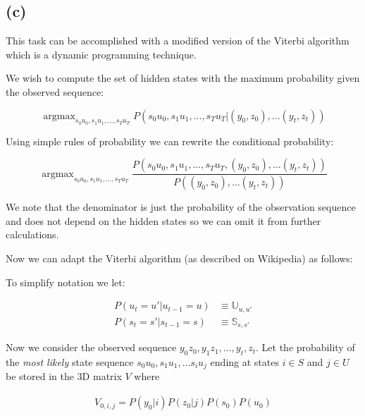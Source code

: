 \documentclass[11pt]{amsart}
\DeclareMathOperator*{\argmax}{argmax}
\begin{document}
\subsection{(c)}

This task can be accomplished with a modified version of the Viterbi algorithm which is a dynamic programming technique.

We wish to compute the set of hidden states with the maximum probability given the observed sequence:

\begin{equation}
\argmax_{s_0 u_0, s_1 u_1, ..., s_T u_T} P(s_0 u_0, s_1 u_1, ..., s_T u_T \vert (y_0, z_0),...(y_t, z_t))
\end{equation}

Using simple rules of probability we can rewrite the conditional probability:

\begin{equation}
\argmax_{s_0 u_0, s_1 u_1, ..., s_T u_T} \frac{P(s_0 u_0, s_1 u_1, ..., s_T u_T, (y_0, z_0),...(y_t, z_t))}{P((y_0, z_0),...(y_t, z_t))}
\end{equation}

We note that the denominator is just the probability of the observation sequence and does not depend on the hidden states so we can omit it from further calculations. 

Now we can adapt the Viterbi algorithm (as described on Wikipedia) as follows:

To simplify notation we let:

\begin{equation}
\begin{aligned}
P(u_t=u' \vert u_{t-1} = u) &\equiv \mathbb{U}_{u, u'}\\
P(s_t=s' \vert s_{t-1} = s) &\equiv \mathbb{S}_{s, s'}
\end{aligned}
\end{equation}

Now we consider the observed sequence $y_0z_0, y_1z_1, ..., y_t, z_t$. Let the probability of the {\it most likely} state sequence $s_0u_0, s_1u_1, ... s_iu_j$ ending at states $i \in S$ and $j \in U$ be stored in the 3D matrix $V$ where

\begin{equation}
\begin{aligned}
V_{0, i, j} = P(y_0 \vert i) P(z_0 \vert j) P(s_0) P(u_0)
\end{aligned}
\end{equation}
\end{document}
